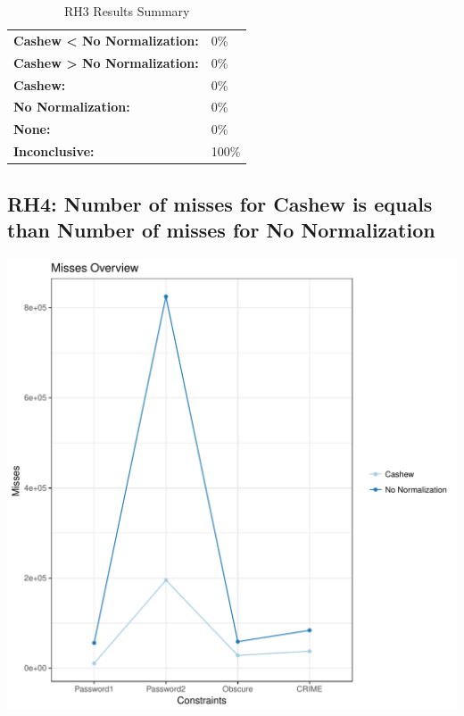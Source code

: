 \documentclass{article}\usepackage[]{graphicx}\usepackage[]{color}
\makeatletter
\def\maxwidth{ %
  \ifdim\Gin@nat@width>\linewidth
    \linewidth
  \else
    \Gin@nat@width
  \fi
}
\newenvironment{knitrout}{}{} %
\makeatother
\begin{document}
	\begin{table}[H]
	\centering
	\caption{RH3 Results Summary}
	\begin{tabular}{ll}
	\textbf{Cashew \textless{} No Normalization:}& 0\% \\
	\textbf{Cashew \textgreater{} No Normalization:}& 0\%\\
	\textbf{Cashew:} & 0\%\\
	\textbf{No Normalization:} & 0\%\\
	\textbf{None:}& 0\%\\
	\textbf{Inconclusive:}& 100\%
			
	
	\end{tabular}
	\end{table}
	
	
	



\subsection{RH4: Number of misses for Cashew is equals than Number of misses for No Normalization}


 
\begin{knitrout}
\color{fgcolor}
\includegraphics[width=\maxwidth]{figure/overview_RH4-1} 

\end{knitrout}
 	
\end{document}
